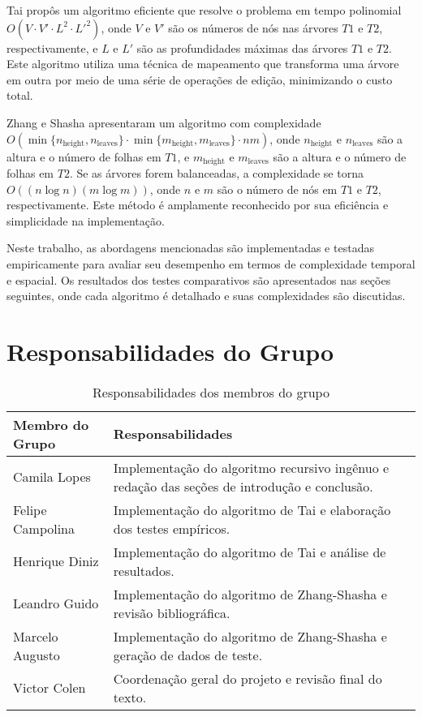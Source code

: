 \documentclass[12pt]{article}
\begin{document}
Tai \cite{tai1979tree} propôs um algoritmo eficiente que resolve o problema em tempo polinomial \( O(V \cdot V' \cdot L^2 \cdot L'^2) \), onde \( V \) e \( V' \) são os números de nós nas árvores \( T1 \) e \( T2 \), respectivamente, e \( L \) e \( L' \) são as profundidades máximas das árvores \( T1 \) e \( T2 \). Este algoritmo utiliza uma técnica de mapeamento que transforma uma árvore em outra por meio de uma série de operações de edição, minimizando o custo total.

Zhang e Shasha \cite{zhang1989simple} apresentaram um algoritmo com complexidade \( O(\min\{n_{\text{height}}, n_{\text{leaves}}\} \cdot \min\{m_{\text{height}}, m_{\text{leaves}}\} \cdot nm) \), onde \( n_{\text{height}} \) e \( n_{\text{leaves}} \) são a altura e o número de folhas em \( T1 \), e \( m_{\text{height}} \) e \( m_{\text{leaves}} \) são a altura e o número de folhas em \( T2 \). Se as árvores forem balanceadas, a complexidade se torna \( O((n \log n) (m \log m)) \), onde \( n \) e \( m \) são o número de nós em \( T1 \) e \( T2 \), respectivamente. Este método é amplamente reconhecido por sua eficiência e simplicidade na implementação.

Neste trabalho, as abordagens mencionadas são implementadas e testadas empiricamente para avaliar seu desempenho em termos de complexidade temporal e espacial. Os resultados dos testes comparativos são apresentados nas seções seguintes, onde cada algoritmo é detalhado e suas complexidades são discutidas.

\section{Responsabilidades do Grupo}
\begin{table}[h!]
\centering
\caption{Responsabilidades dos membros do grupo}
\begin{tabularx}{\textwidth}{|>{\centering\arraybackslash}X|>{\centering\arraybackslash}X|}
    \hline
    \textbf{Membro do Grupo} & \textbf{Responsabilidades} \\
    \hline
    Camila Lopes & Implementação do algoritmo recursivo ingênuo e redação das seções de introdução e conclusão. \\
    \hline
    Felipe Campolina & Implementação do algoritmo de Tai e elaboração dos testes empíricos. \\
    \hline
    Henrique Diniz & Implementação do algoritmo de Tai e análise de resultados. \\
    \hline
    Leandro Guido & Implementação do algoritmo de Zhang-Shasha e revisão bibliográfica. \\
    \hline
    Marcelo Augusto & Implementação do algoritmo de Zhang-Shasha e geração de dados de teste. \\
    \hline
    Victor Colen & Coordenação geral do projeto e revisão final do texto. \\
    \hline
\end{tabularx}
\end{table}
\end{document}
